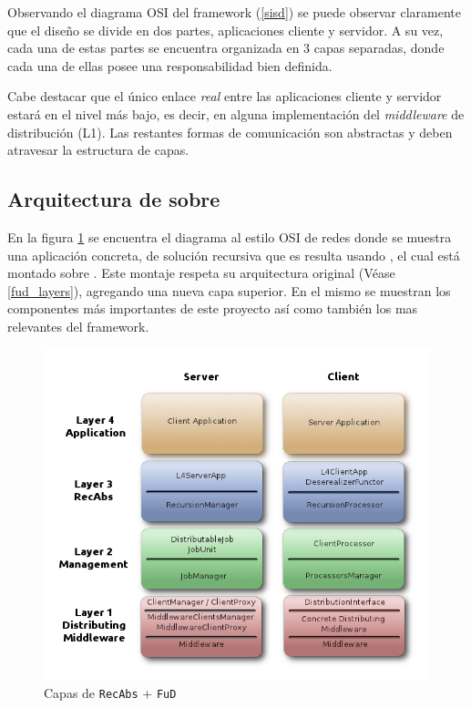 Observando el diagrama OSI del framework \fud(\ref{sisd}) se puede observar claramente que el diseño se divide en dos partes, aplicaciones
cliente y servidor. A su vez, cada una de estas partes se encuentra organizada en 3 capas separadas, donde cada una de ellas posee una
responsabilidad bien definida.


Cabe destacar que el único enlace \textit{real} entre las aplicaciones cliente y servidor estará en el nivel más bajo, es decir, en
alguna implementación del \textit{middleware} de distribución (L1). Las restantes formas de comunicación son abstractas y deben
atravesar la estructura de capas.

\subsection{Arquitectura de \rc{} sobre \fud}

En la figura \ref{recabs_layers} se encuentra el diagrama al estilo OSI de redes donde se muestra una aplicación concreta, de solución
recursiva que es resulta usando \rc, el cual está montado sobre \fud. Este montaje respeta su arquitectura original (Véase
\ref{fud_layers}), agregando una nueva capa superior. En el mismo se muestran los componentes más importantes de este proyecto así como
también los mas relevantes del framework.

\begin{figure}[ht]
    \includegraphics[scale=.6]{images/recabs.png}
    \caption{Capas de \texttt{RecAbs} + \texttt{FuD}}
    \label{recabs_layers}
\end{figure}

